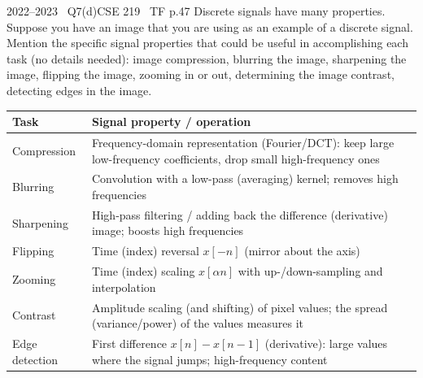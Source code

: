 \begin{qcard}{2022--2023 \textbullet\ Q7(d)}{CSE 219 \textbullet\ TF p.4}{7}
Discrete signals have many properties. Suppose you have an image that you are using as an example of a discrete signal. Mention the specific signal properties that could be useful in accomplishing each task (no details needed): image compression, blurring the image, sharpening the image, flipping the image, zooming in or out, determining the image contrast, detecting edges in the image.
\end{qcard}
\begin{solution}
\begin{center}\small\begin{tabular}{@{}p{3.2cm}p{11cm}@{}}\toprule
Task & Signal property / operation\\\midrule
Compression & Frequency-domain representation (Fourier/DCT): keep large low-frequency coefficients, drop small high-frequency ones\\
Blurring & Convolution with a low-pass (averaging) kernel; removes high frequencies\\
Sharpening & High-pass filtering / adding back the difference (derivative) image; boosts high frequencies\\
Flipping & Time (index) reversal $x[-n]$ (mirror about the axis)\\
Zooming & Time (index) scaling $x[\alpha n]$ with up-/down-sampling and interpolation\\
Contrast & Amplitude scaling (and shifting) of pixel values; the spread (variance/power) of the values measures it\\
Edge detection & First difference $x[n]-x[n-1]$ (derivative): large values where the signal jumps; high-frequency content\\\bottomrule
\end{tabular}\end{center}
\end{solution}

